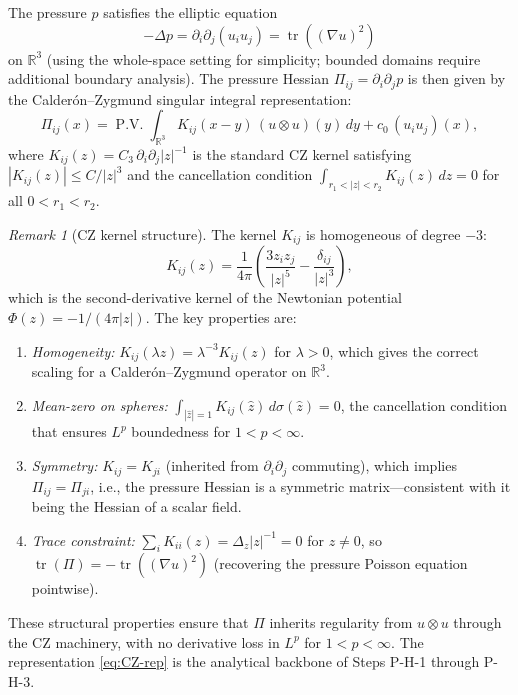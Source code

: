 \documentclass[11pt]{article}
\theoremstyle{definition}
\theoremstyle{remark}
\newtheorem{remark}[theorem]{Remark}
\DeclareMathOperator{\tr}{tr}
\DeclareMathOperator{\PV}{P.V.}
\newcommand{\R}{\mathbb{R}}
\begin{document}
The pressure $p$ satisfies the elliptic equation
\begin{equation}\label{eq:pressure-elliptic}
  -\Delta p = \partial_i\partial_j(u_i u_j) = \tr((\nabla u)^2)
\end{equation}
on $\R^3$ (using the whole-space setting for simplicity; bounded domains require
additional boundary analysis).  The pressure Hessian $\Pi_{ij} = \partial_i\partial_j p$
is then given by the Calder\'on--Zygmund singular integral representation:
\begin{equation}\label{eq:CZ-rep}
  \Pi_{ij}(x) = \PV\int_{\R^3} K_{ij}(x-y)\,(u\otimes u)(y)\, dy
  + c_0\,(u_i u_j)(x),
\end{equation}
where $K_{ij}(z) = C_3\,\partial_i\partial_j|z|^{-1}$ is the standard CZ kernel
satisfying $|K_{ij}(z)| \leq C/|z|^3$ and the cancellation condition
$\int_{r_1 < |z| < r_2} K_{ij}(z)\, dz = 0$ for all $0 < r_1 < r_2$.

\begin{remark}[CZ kernel structure]
\label{rem:CZ-kernel}
The kernel $K_{ij}$ is homogeneous of degree $-3$:
\[
  K_{ij}(z) = \frac{1}{4\pi}\left(\frac{3 z_i z_j}{|z|^5}
  - \frac{\delta_{ij}}{|z|^3}\right),
\]
which is the second-derivative kernel of the Newtonian potential
$\Phi(z) = -1/(4\pi|z|)$.  The key properties are:
\begin{enumerate}[nosep]
  \item \emph{Homogeneity:} $K_{ij}(\lambda z) = \lambda^{-3} K_{ij}(z)$ for
    $\lambda > 0$, which gives the correct scaling for a Calder\'on--Zygmund
    operator on $\R^3$.
  \item \emph{Mean-zero on spheres:} $\int_{|\hat z| = 1} K_{ij}(\hat z)\,
    d\sigma(\hat z) = 0$, the cancellation condition that ensures $L^p$
    boundedness for $1 < p < \infty$.
  \item \emph{Symmetry:} $K_{ij} = K_{ji}$ (inherited from $\partial_i\partial_j$
    commuting), which implies $\Pi_{ij} = \Pi_{ji}$, i.e., the pressure
    Hessian is a symmetric matrix---consistent with it being the Hessian of a
    scalar field.
  \item \emph{Trace constraint:} $\sum_i K_{ii}(z) = \Delta_z |z|^{-1} = 0$
    for $z \neq 0$, so $\tr(\Pi) = -\tr((\nabla u)^2)$ (recovering the
    pressure Poisson equation pointwise).
\end{enumerate}
These structural properties ensure that $\Pi$ inherits regularity from $u \otimes u$
through the CZ machinery, with no derivative loss in $L^p$ for $1 < p < \infty$.
The representation \eqref{eq:CZ-rep} is the analytical backbone of Steps P-H-1
through P-H-3.
\end{remark}
\end{document}
